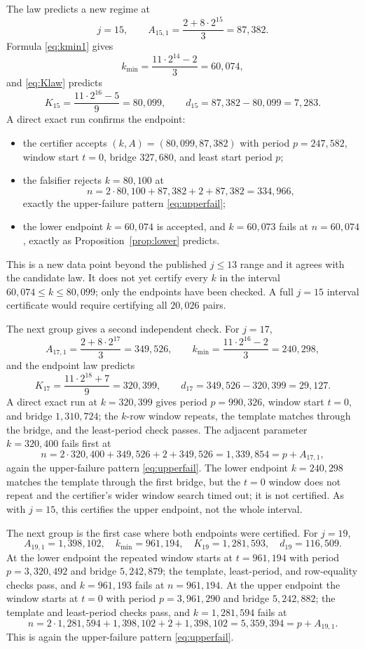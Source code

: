 \documentclass[11pt]{article}
\theoremstyle{remark}
\begin{document}
The law predicts a new regime at
\[
j=15,\qquad
A_{15,1}=\frac{2+8\cdot2^{15}}{3}=87{,}382.
\]
Formula \eqref{eq:kmin1} gives
\[
k_{\min}=\frac{11\cdot2^{14}-2}{3}=60{,}074,
\]
and \eqref{eq:Klaw} predicts
\[
K_{15}=\frac{11\cdot2^{16}-5}{9}=80{,}099,
\qquad
d_{15}=87{,}382-80{,}099=7{,}283.
\]
A direct exact run confirms the endpoint:
\begin{itemize}
\item the certifier accepts \((k,A)=(80{,}099,87{,}382)\) with period \(p=247{,}582\), window start \(t=0\), bridge \(327{,}680\), and least start period \(p\);
\item the falsifier rejects \(k=80{,}100\) at
\[
n=2\cdot80{,}100+87{,}382+2+87{,}382=334{,}966,
\]
exactly the upper-failure pattern \eqref{eq:upperfail};
\item the lower endpoint \(k=60{,}074\) is accepted, and \(k=60{,}073\) fails at \(n=60{,}074\), exactly as Proposition~\ref{prop:lower} predicts.
\end{itemize}
This is a new data point beyond the published \(j\le13\) range and it agrees with the candidate law. It does not yet certify every \(k\) in the interval \(60{,}074\le k\le80{,}099\); only the endpoints have been checked. A full \(j=15\) interval certificate would require certifying all \(20{,}026\) pairs.

The next group gives a second independent check. For \(j=17\),
\[
A_{17,1}=\frac{2+8\cdot2^{17}}{3}=349{,}526,
\qquad
k_{\min}=\frac{11\cdot2^{16}-2}{3}=240{,}298,
\]
and the endpoint law predicts
\[
K_{17}=\frac{11\cdot2^{18}+7}{9}=320{,}399,
\qquad
d_{17}=349{,}526-320{,}399=29{,}127.
\]
A direct exact run at \(k=320{,}399\) gives period \(p=990{,}326\), window start \(t=0\), and bridge \(1{,}310{,}724\); the \(k\)-row window repeats, the template matches through the bridge, and the least-period check passes. The adjacent parameter \(k=320{,}400\) fails first at
\[
n=2\cdot320{,}400+349{,}526+2+349{,}526=1{,}339{,}854=p+A_{17,1},
\]
again the upper-failure pattern \eqref{eq:upperfail}. The lower endpoint \(k=240{,}298\) matches the template through the first bridge, but the \(t=0\) window does not repeat and the certifier's wider window search timed out; it is not certified. As with \(j=15\), this certifies the upper endpoint, not the whole interval.

The next group is the first case where both endpoints were certified. For \(j=19\),
\[
A_{19,1}=1{,}398{,}102,\quad
k_{\min}=961{,}194,\quad
K_{19}=1{,}281{,}593,\quad
d_{19}=116{,}509.
\]
At the lower endpoint the repeated window starts at \(t=961{,}194\) with period \(p=3{,}320{,}492\) and bridge \(5{,}242{,}879\); the template, least-period, and row-equality checks pass, and \(k=961{,}193\) fails at \(n=961{,}194\). At the upper endpoint the window starts at \(t=0\) with period \(p=3{,}961{,}290\) and bridge \(5{,}242{,}882\); the template and least-period checks pass, and \(k=1{,}281{,}594\) fails at
\[
n=2\cdot1{,}281{,}594+1{,}398{,}102+2+1{,}398{,}102=5{,}359{,}394=p+A_{19,1}.
\]
This is again the upper-failure pattern \eqref{eq:upperfail}.
\end{document}
